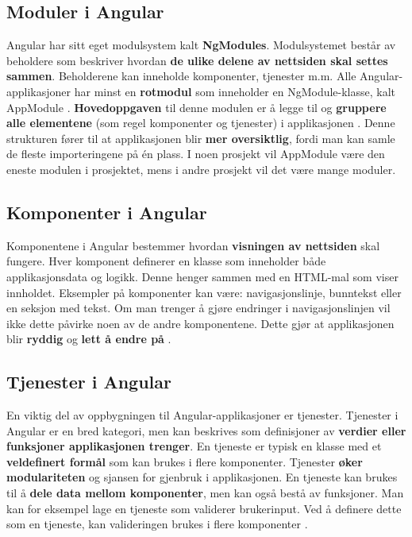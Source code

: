 \subsection{Moduler i Angular}
Angular har sitt eget modulsystem kalt \textbf{NgModules}. Modulsystemet består av beholdere som beskriver hvordan  \textbf{de ulike delene av nettsiden skal settes sammen}. Beholderene kan inneholde komponenter, tjenester m.m. Alle Angular-applikasjoner har minst en \textbf{rotmodul} som inneholder en NgModule-klasse, kalt AppModule \cite{angularModules}. \textbf{Hovedoppgaven} til denne modulen er å legge til og \textbf{gruppere alle elementene} (som regel komponenter og tjenester) i applikasjonen \cite{angularModulesUnderstanding}. Denne strukturen fører til at applikasjonen blir \textbf{mer oversiktlig}, fordi man kan samle de fleste importeringene på én plass. I noen prosjekt vil AppModule være den eneste modulen i prosjektet, mens i andre prosjekt vil det være mange moduler. 

\subsection{Komponenter i Angular}
\label{AngularKomponenter}
Komponentene i Angular bestemmer hvordan \textbf{visningen av nettsiden} skal fungere. Hver komponent definerer en klasse som inneholder både applikasjonsdata og logikk. Denne henger sammen med en HTML-mal som viser innholdet. Eksempler på komponenter kan være: navigasjonslinje, bunntekst eller en seksjon med tekst. Om man trenger å gjøre endringer i navigasjonslinjen vil ikke dette påvirke noen av de andre komponentene. Dette gjør at applikasjonen blir \textbf{ryddig} og \textbf{lett å endre på} \cite{angularComponents}.

\subsection{Tjenester i Angular}
En viktig del av oppbygningen til Angular-applikasjoner er tjenester. Tjenester i Angular er en bred kategori, men kan beskrives som definisjoner av \textbf{verdier eller funksjoner applikasjonen trenger}. En tjeneste er typisk en klasse med et \textbf{veldefinert formål} som kan brukes i flere komponenter. Tjenester \textbf{øker modulariteten} og sjansen for gjenbruk i applikasjonen. En tjeneste kan brukes til å \textbf{dele data mellom komponenter}, men kan også bestå av funksjoner. Man kan for eksempel lage en tjeneste som validerer brukerinput. Ved å definere dette som en tjeneste, kan valideringen brukes i flere komponenter \cite{angularServices}.

